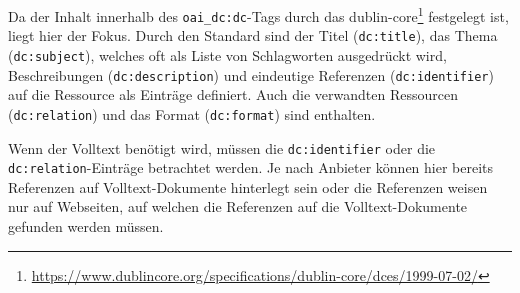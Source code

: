 Da der Inhalt innerhalb des \texttt{oai_dc:dc}-Tags
durch das \gls{dublin-core}\footnote{\url{https://www.dublincore.org/specifications/dublin-core/dces/1999-07-02/}}
festgelegt ist,
liegt hier der Fokus.
Durch den Standard sind
der Titel (\texttt{dc:title}),
das Thema (\texttt{dc:subject}), welches oft als Liste von Schlagworten ausgedrückt wird,
Beschreibungen (\texttt{dc:description})
und
eindeutige Referenzen (\texttt{dc:identifier}) auf die Ressource
als Einträge definiert.
Auch die verwandten Ressourcen (\texttt{dc:relation})
und das Format (\texttt{dc:format})
sind enthalten.

Wenn der Volltext benötigt wird,
müssen die \texttt{dc:identifier} oder die \texttt{dc:relation}-Einträge
betrachtet werden.
Je nach Anbieter können hier bereits Referenzen auf Volltext-Dokumente hinterlegt sein
oder die Referenzen weisen nur auf Webseiten,
auf welchen die Referenzen auf die Volltext-Dokumente gefunden werden müssen.
